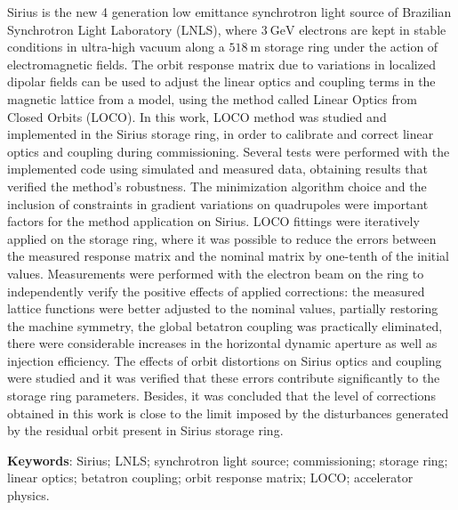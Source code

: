 \begin{resumo}
\renewcommand{\sfdefault}{\rmdefault}
    Sirius is the new 4 generation low emittance synchrotron light source of Brazilian Synchrotron Light Laboratory (LNLS), where $\SI{3}{\giga\electronvolt}$ electrons are kept in stable conditions in ultra-high vacuum along a $\SI{518}{\meter}$ storage ring under the action of electromagnetic fields. The orbit response matrix due to variations in localized dipolar fields can be used to adjust the linear optics and coupling terms in the magnetic lattice from a model, using the method called Linear Optics from Closed Orbits (LOCO). In this work, LOCO method was studied and implemented in the Sirius storage ring, in order to calibrate and correct linear optics and coupling during commissioning. Several tests were performed with the implemented code using simulated and measured data, obtaining results that verified the method's robustness. The minimization algorithm choice and the inclusion of constraints in gradient variations on quadrupoles were important factors for the method application on Sirius. LOCO fittings were iteratively applied on the storage ring, where it was possible to reduce the errors between the measured response matrix and the nominal matrix by one-tenth of the initial values. Measurements were performed with the electron beam on the ring to independently verify the positive effects of applied corrections: the measured lattice functions were better adjusted to the nominal values, partially restoring the machine symmetry, the global betatron coupling was practically eliminated, there were considerable increases in the horizontal dynamic aperture as well as injection efficiency. The effects of orbit distortions on Sirius optics and coupling were studied and it was verified that these errors contribute significantly to the storage ring parameters. Besides, it was concluded that the level of corrections obtained in this work is close to the limit imposed by the disturbances generated by the residual orbit present in Sirius storage ring.
    
    \vspace{\onelineskip}
    \noindent\textbf{Keywords}: Sirius; LNLS; synchrotron light source; commissioning; storage ring; linear optics; betatron coupling; orbit response matrix; LOCO; accelerator physics.
    \vspace{\fill}
\end{resumo}

\renewcommand{\sfdefault}{\rmdefault}
\listoffigures*
\cleardoublepage


\renewcommand{\sfdefault}{\rmdefault}
\listoftables*
\cleardoublepage

\renewcommand{\sfdefault}{\rmdefault}
\printglossaries
\cleardoublepage


\renewcommand{\sfdefault}{\rmdefault}
\tableofcontents*
\cleardoublepage
